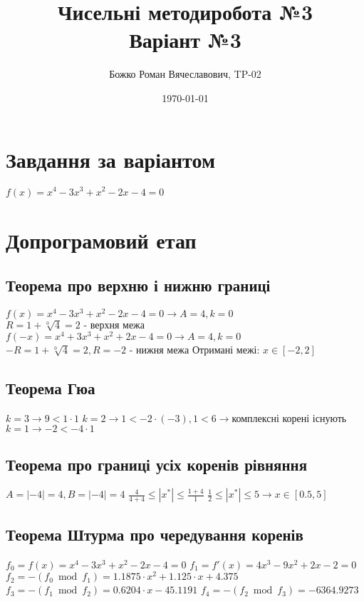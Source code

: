 \documentclass{report}
\begin{document}
\title{Чисельні методи робота №3\\Варіант №3}
\author{Божко Роман Вячеславович, TP-02}
\date{\today}

\maketitle

\section*{Завдання за варіантом}
$f(x) = x^4 - 3x^3 + x^2 - 2x - 4 = 0$

\section*{Допрограмовий етап}
\subsection*{Теорема про верхню і нижню границі}
$f(x) = x^4 - 3x^3 + x^2 - 2x - 4 = 0 \to A = 4, k = 0$\newline
$R = 1 + \sqrt[0]{4} = 2 \mbox{ - верхня межа}$\newline
$f(-x) = x^4 + 3x^3 + x^2 + 2x - 4 = 0 \to A = 4, k = 0$\newline
$-R = 1 + \sqrt[0]{4} = 2, R = -2 \mbox{ - нижня межа}$\newline
Отримані межі: $x \in \left[-2, 2\right]$
\subsection*{Теорема Гюа}
$k = 3 \to 9 < 1 \cdot 1$\newline
$k = 2 \to 1 < -2 \cdot (-3), 1 < 6 \to \mbox{комплексні корені існують}$\newline
$k = 1 \to -2 < -4 \cdot 1$
\subsection*{Теорема про границі усіх коренів рівняння}
$A = |-4| = 4, B = |-4| = 4$\newline
$\frac{4}{4 + 4} \leq |x^{*}| \leq \frac{1 + 4}{1}$\newline
$\frac{1}{2} \leq |x^{*}| \leq 5 \to x \in \left[0.5, 5\right]$
\subsection*{Теорема Штурма про чередування коренів}
$f_0 = f(x) = x^4 - 3x^3 + x^2 - 2x - 4 = 0$\newline
$f_1 = f'(x) = 4x^3 - 9x^2 + 2x - 2 = 0$\newline
$f_2 = -(f_0 \bmod f_1) = 1.1875 \cdot x^2 + 1.125 \cdot x + 4.375$\newline
$f_3 = -(f_1 \bmod f_2) = 0.6204 \cdot x - 45.1191$\newline
$f_4 = -(f_2 \bmod f_3) = -6364.9273$
\end{document}

